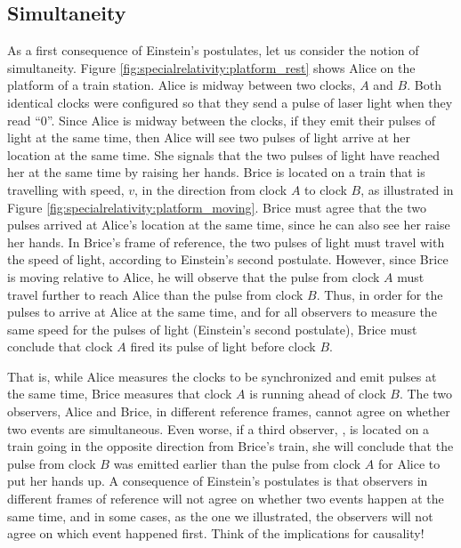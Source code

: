 \subsection{Simultaneity}
As a first consequence of Einstein's postulates, let us consider the notion of simultaneity. Figure \ref{fig:specialrelativity:platform_rest} shows Alice on the platform of a train station. Alice is midway between two clocks, $A$ and $B$. Both identical clocks were configured so that they send a pulse of laser light when they read ``0''. Since Alice is midway between the clocks, if they emit their pulses of light at the same time, then Alice will see two pulses of light arrive at her location at the same time. She signals that the two pulses of light have reached her at the same time by raising her hands. 
Brice is located on a train that is travelling with speed, $v$, in the direction from clock $A$ to clock $B$, as illustrated in Figure \ref{fig:specialrelativity:platform_moving}.
Brice must agree that the two pulses arrived at Alice's location at the same time, since he can also see her raise her hands. In Brice's frame of reference, the two pulses of light must travel with the speed of light, according to Einstein's second postulate. However, since Brice is moving relative to Alice, he will observe that the pulse from clock $A$ must travel further to reach Alice than the pulse from clock $B$. Thus, in order for the pulses to arrive at Alice at the same time, and for all observers to measure the same speed for the pulses of light (Einstein's second postulate), Brice must conclude that clock $A$ fired its pulse of light before clock $B$. 

That is, while Alice measures the clocks to be synchronized and emit pulses at the same time, Brice measures that clock $A$ is running ahead of clock $B$. The two observers, Alice and Brice, in different reference frames, cannot agree on whether two events are simultaneous. Even worse, if a third observer, \chloens, is located on a train going in the opposite direction from Brice's train, she will conclude that the pulse from clock $B$ was emitted earlier than the pulse from clock $A$ for Alice to put her hands up. A consequence of Einstein's postulates is that observers in different frames of reference will not agree on whether two events happen at the same time, and in some cases, as the one we illustrated, the observers will not agree on which event happened first. Think of the implications for causality!

